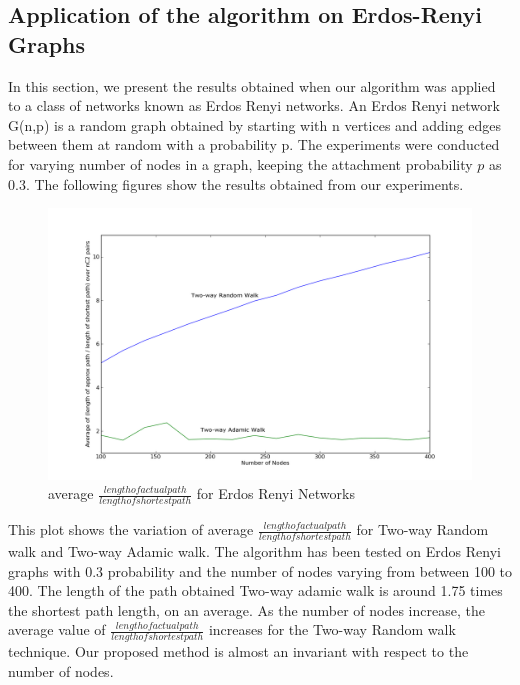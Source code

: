 \documentclass[a4paper,12pt]{article}
\begin{document}
\subsection{Application of the algorithm on Erdos-Renyi Graphs}
In this section, we present the results obtained when our algorithm was applied to a class of networks known as Erdos Renyi networks. An Erdos Renyi network G(n,p) is a random graph obtained by starting with n vertices and adding edges between them at random with a probability p. The experiments were conducted for varying number of nodes in a graph, keeping the attachment probability $p$ as $0.3$. The following figures show the results obtained from our experiments.

\begin{figure}[htp]
\centering
\includegraphics[scale=0.40]{Results/ERratio2Random2Adamic.png}
\caption{average $\frac{length of actual path}{length of shortest path}$ for Erdos Renyi Networks}
\label{ERratio2Random2Adamic}
\end{figure}
This plot shows the variation of average $\frac{length of actual path}{length of shortest path}$ for Two-way Random walk and Two-way Adamic walk. The algorithm has been tested on Erdos Renyi graphs with 0.3 probability and the number of nodes varying from between 100 to 400. The length of the path obtained Two-way adamic walk is around 1.75 times the shortest path length, on an average. As the number of nodes increase, the average value of $\frac{length of actual path}{length of shortest path}$ increases for the Two-way Random walk technique. Our proposed method is almost an invariant with respect to the number of nodes. 
\end{document}
